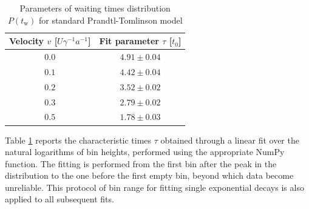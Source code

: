 \begin{table}
\centering 
\begin{tabular}{cc}
    \toprule
    Velocity $v$ [$U \gamma ^{-1} a^{-1}$] & Fit parameter $\tau$ [$t_0$]  \\
    \midrule 
    $0.0$ & $4.91\pm 0.04$\\
    $0.1$ & $4.42 \pm 0.04$ \\
    $0.2$ & $3.52\pm 0.02$\\
    $0.3$ & $2.79\pm 0.02$ \\
    $0.5$ & $1.78 \pm 0.03$ \\
    \bottomrule
\end{tabular}
\caption{Parameters of waiting times distribution $P(t_\text{w})$ for standard Prandtl-Tomlinson model}
\label{tab:simplePT}
\end{table}
Table \ref{tab:simplePT} reports the characteristic times $\tau$ obtained through a linear fit over the natural logarithms of bin heights, performed using the appropriate NumPy function. The fitting is performed from the first bin after the peak in the distribution to the one before the first empty bin, beyond which data become unreliable. This protocol of bin range for fitting single exponential decays is also applied to all subsequent fits.

